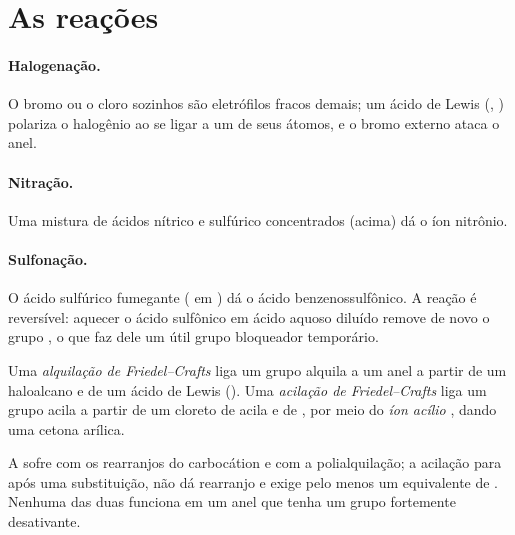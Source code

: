 \section{As reações}

\paragraph{Halogenação.} O bromo ou o cloro sozinhos são eletrófilos fracos
demais; um ácido de Lewis (, ) polariza o halogênio ao se
ligar a um de seus átomos, e o bromo externo ataca o anel.

\paragraph{Nitração.} Uma mistura de ácidos nítrico e sulfúrico concentrados
(acima) dá o íon nitrônio.

\paragraph{Sulfonação.} O ácido sulfúrico fumegante ( em )
dá o ácido benzenossulfônico. A reação é reversível: aquecer o ácido sulfônico
em ácido aquoso diluído remove de novo o grupo , o que faz dele um
útil grupo bloqueador temporário.

\begin{definition}\label{def:b2:aromatic-substitution:friedel-crafts}
Uma \emph{alquilação de Friedel--Crafts} liga um grupo
alquila a um anel  a partir de um haloalcano e de um ácido de Lewis
(). Uma \emph{acilação de Friedel--Crafts}
liga um grupo acila  a partir de um cloreto de acila e de , por
meio do \emph{íon acílio} , dando uma cetona arílica.
\end{definition}

\begin{proposition}\label{prop:b2:aromatic-substitution:friedel-crafts-limits}
A  sofre com os rearranjos do carbocátion e com a
polialquilação; a acilação para após uma substituição, não dá rearranjo e
exige pelo menos um equivalente de . Nenhuma das duas funciona em um
anel que tenha um grupo fortemente desativante.
\end{proposition}

